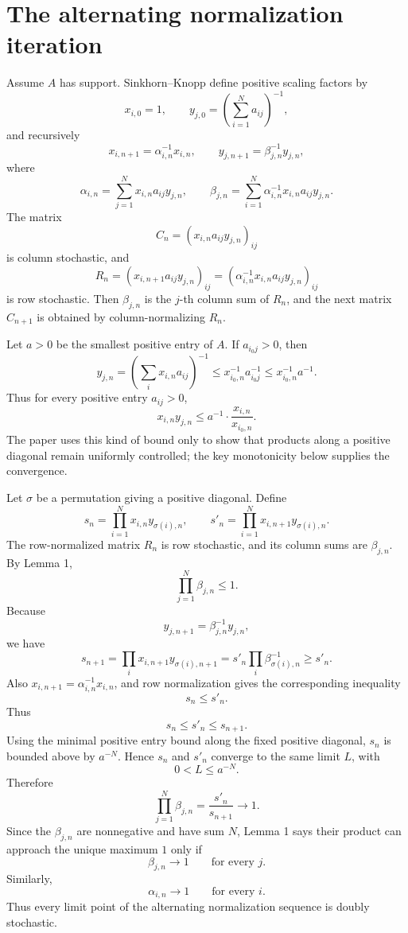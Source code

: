 \section{The alternating normalization iteration}
Assume \(A\) has support.  Sinkhorn--Knopp define positive scaling factors by
\[
  x_{i,0}=1,
  \qquad
  y_{j,0}=\left(\sum_{i=1}^N a_{ij}\right)^{-1},
\]
and recursively
\[
  x_{i,n+1}=\alpha_{i,n}^{-1}x_{i,n},
  \qquad
  y_{j,n+1}=\beta_{j,n}^{-1}y_{j,n},
\]
where
\begin{equation}
  \alpha_{i,n}=\sum_{j=1}^N x_{i,n}a_{ij}y_{j,n},
  \qquad
  \beta_{j,n}=\sum_{i=1}^N \alpha_{i,n}^{-1}x_{i,n}a_{ij}y_{j,n}.
  \label{eq:SK-alpha-beta}
\end{equation}
The matrix
\[
  C_n=(x_{i,n}a_{ij}y_{j,n})_{ij}
\]
is column stochastic, and
\[
  R_n=(x_{i,n+1}a_{ij}y_{j,n})_{ij}
  =(\alpha_{i,n}^{-1}x_{i,n}a_{ij}y_{j,n})_{ij}
\]
is row stochastic.  Then \(\beta_{j,n}\) is the \(j\)-th column sum of \(R_n\), and the next matrix \(C_{n+1}\) is obtained by column-normalizing \(R_n\).

Let \(a>0\) be the smallest positive entry of \(A\).  If \(a_{i_0j}>0\), then
\[
  y_{j,n}=\left(\sum_i x_{i,n}a_{ij}\right)^{-1}
  \le x_{i_0,n}^{-1}a_{i_0j}^{-1}
  \le x_{i_0,n}^{-1}a^{-1}.
\]
Thus for every positive entry \(a_{ij}>0\),
\begin{equation}
  x_{i,n}y_{j,n}\le a^{-1}\cdot \frac{x_{i,n}}{x_{i_0,n}}.
\end{equation}
The paper uses this kind of bound only to show that products along a positive diagonal remain uniformly controlled; the key monotonicity below supplies the convergence.

Let \(\sigma\) be a permutation giving a positive diagonal.  Define
\[
  s_n=\prod_{i=1}^N x_{i,n}y_{\sigma(i),n},
  \qquad
  s'_n=\prod_{i=1}^N x_{i,n+1}y_{\sigma(i),n}.
\]
The row-normalized matrix \(R_n\) is row stochastic, and its column sums are \(\beta_{j,n}\).  By Lemma 1,
\[
  \prod_{j=1}^N\beta_{j,n}\le1.
\]
Because
\[
  y_{j,n+1}=\beta_{j,n}^{-1}y_{j,n},
\]
we have
\[
  s_{n+1}=\prod_i x_{i,n+1}y_{\sigma(i),n+1}
  =s'_n\prod_i \beta_{\sigma(i),n}^{-1}
  \ge s'_n.
\]
Also \(x_{i,n+1}=\alpha_{i,n}^{-1}x_{i,n}\), and row normalization gives the corresponding inequality
\[
  s_n\le s'_n.
\]
Thus
\begin{equation}
  s_n\le s'_n\le s_{n+1}.
  \label{eq:SK-s-monotone}
\end{equation}
Using the minimal positive entry bound along the fixed positive diagonal, \(s_n\) is bounded above by \(a^{-N}\).  Hence \(s_n\) and \(s'_n\) converge to the same limit \(L\), with
\[
  0<L\le a^{-N}.
\]
Therefore
\[
  \prod_{j=1}^N\beta_{j,n}=\frac{s'_n}{s_{n+1}}\to1.
\]
Since the \(\beta_{j,n}\) are nonnegative and have sum \(N\), Lemma 1 says their product can approach the unique maximum \(1\) only if
\[
  \beta_{j,n}\to1\qquad\text{for every }j.
\]
Similarly,
\[
  \alpha_{i,n}\to1\qquad\text{for every }i.
\]
Thus every limit point of the alternating normalization sequence is doubly stochastic.

